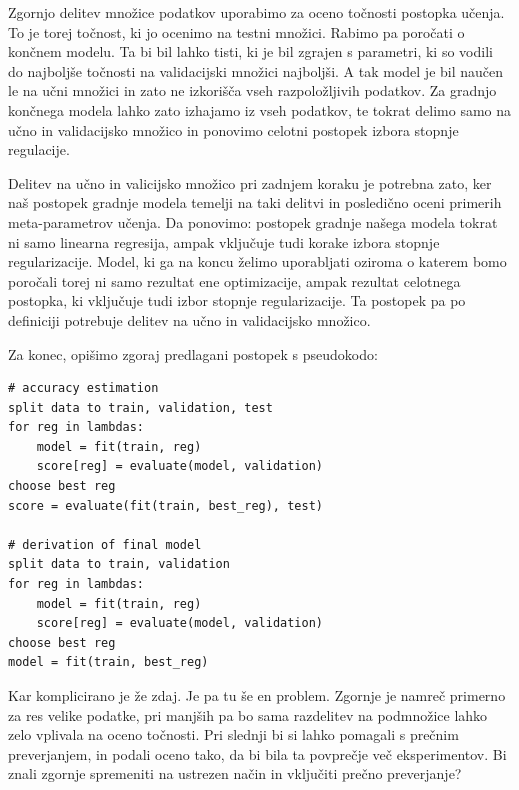 Zgornjo delitev množice podatkov uporabimo za oceno točnosti postopka učenja. To je torej točnost, ki jo ocenimo na testni množici. Rabimo pa poročati o končnem modelu. Ta bi bil lahko tisti, ki je bil zgrajen s parametri, ki so vodili do najboljše točnosti na validacijski množici najboljši. A tak model je bil naučen le na učni množici in zato ne izkorišča vseh razpoložljivih podatkov. Za gradnjo končnega modela lahko zato izhajamo iz vseh podatkov, te tokrat delimo samo na učno in validacijsko množico in ponovimo celotni postopek izbora stopnje regulacije.

Delitev na učno in valicijsko množico pri zadnjem koraku je potrebna zato, ker naš postopek gradnje modela temelji na taki delitvi in posledično oceni primerih meta-parametrov učenja. Da ponovimo: postopek gradnje našega modela tokrat ni samo linearna regresija, ampak vključuje tudi korake izbora stopnje regularizacije. Model, ki ga na koncu želimo uporabljati oziroma o katerem bomo poročali torej ni samo rezultat ene optimizacije, ampak rezultat celotnega postopka, ki vključuje tudi izbor stopnje regularizacije. Ta postopek pa po definiciji potrebuje delitev na učno in validacijsko množico.

Za konec, opišimo zgoraj predlagani postopek s pseudokodo:

\vspace*{3mm}
\begin{lstlisting}
# accuracy estimation
split data to train, validation, test
for reg in lambdas:
    model = fit(train, reg)
    score[reg] = evaluate(model, validation)
choose best reg
score = evaluate(fit(train, best_reg), test)

# derivation of final model
split data to train, validation
for reg in lambdas:
    model = fit(train, reg)
    score[reg] = evaluate(model, validation)
choose best reg
model = fit(train, best_reg)
\end{lstlisting}

Kar komplicirano je že zdaj. Je pa tu še en problem. Zgornje je namreč primerno za res velike podatke, pri manjših pa bo sama razdelitev na podmnožice lahko zelo vplivala na oceno točnosti. Pri slednji bi si lahko pomagali s prečnim preverjanjem, in podali oceno tako, da bi bila ta povprečje več eksperimentov. Bi znali zgornje spremeniti na ustrezen način in vključiti prečno preverjanje?

